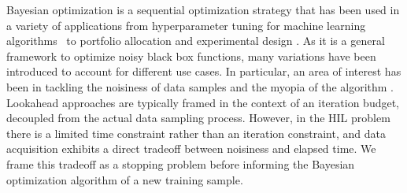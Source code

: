 Bayesian optimization is a sequential optimization strategy that has been used in a variety of applications from hyperparameter tuning for machine learning algorithms~\citep{NIPS2012_4522,pmlr-v22-mahendran12} to portfolio allocation \citep{1009.5419} and experimental design \citep{Brochu2009}. As it is a general framework to optimize noisy black box functions, many variations have been introduced to account for different use cases. In particular, an area of interest has been in tackling the noisiness of data samples \citep{rue2009,1603.02038,1410.7172} and the myopia of the algorithm \citep{NIPS2016_6188,1510.06299}. Lookahead approaches are typically framed in the context of an iteration budget, decoupled from the actual data sampling process. However, in the HIL problem there is a limited time constraint rather than an iteration constraint, and data acquisition exhibits a direct tradeoff between noisiness and elapsed time. We frame this tradeoff as a stopping problem before informing the Bayesian optimization algorithm of a new training sample.